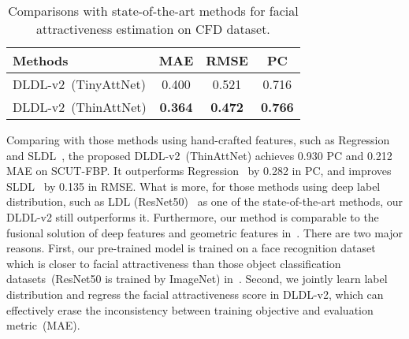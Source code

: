 \documentclass[5p,times,twocolumn]{elsarticle}
\begin{document}
\begin{table}
	\centering
	\small
	\caption{Comparisons with state-of-the-art methods for facial attractiveness estimation on CFD dataset. }\label{tab:sotacfd}
	\begin{tabular}{|@{\;}l@{\;}| *{3}{@{\;}c@{\;}}|}
		\hline
		Methods     &MAE   &RMSE  & PC\\
		\hline
		DLDL-v2~(TinyAttNet)                &0.400 &0.521 &0.716\\
	        DLDL-v2~(ThinAttNet)              &\textbf{0.364} &\textbf{0.472} &\textbf{0.766}\\
		\hline
	\end{tabular}
\end{table}


Comparing with those methods using hand-crafted features, such as Regression~\cite{xie2015scut} and SLDL~\cite{rensense}, the proposed DLDL-v2~(ThinAttNet) achieves 0.930 PC and 0.212 MAE on SCUT-FBP. It outperforms Regression~\cite{xie2015scut} by 0.282 in PC, and improves SLDL~\cite{rensense} by 0.135 in RMSE. What is more, for those methods using deep label distribution, such as LDL (ResNet50)~\cite{fan2017label} as one of the state-of-the-art methods, our DLDL-v2 still outperforms it. Furthermore, our method is comparable to the fusional solution of deep features and geometric features in~\cite{fan2017label}. There are two major reasons. First, our pre-trained model is trained on a face recognition dataset which is closer to facial attractiveness than those object classification datasets~(ResNet50 is trained by ImageNet) in~\cite{fan2017label}. Second, we jointly learn label distribution and regress the facial attractiveness score in DLDL-v2, which can effectively erase the inconsistency between training objective and evaluation metric~(MAE).

\iffalse
From the model parameters and inference time of view, as reported in Table~\ref{tab:csoaatt}, the performance of our DLDL-v2~(ThinAttNet) with 6 fewer parameters and 2.1 faster speed is comparable to that of the state-of-the-art~\cite{fan2017label} which is a fusional solution of deep features and geometric features. Meanwhile, we also report the performance of DLDL-v2~(TinyAttNet) with 26 fewer parameters and 4.5 faster inference speed, which is still comparable to the one using only ResNet50 in~\cite{fan2017label}.
\fi
\end{document}
